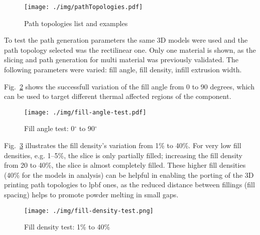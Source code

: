 \begin{table}[!hbt]
\centering
\caption{Path topology main fixed parameters}%
\label{tab:path-topologies-param}
\end{table}

\begin{figure}[!hbt]
  \centering
    \texttt{[image: ./img/pathTopologies.pdf]}
  \caption{Path topologies list and examples}%
\label{fig:path-topologies-test}
\end{figure}

To test the path generation parameters the same 3D models were used and the path
topology selected was the rectilinear one. Only one material is shown, as
the slicing and path generation for multi material was previously validated.
The following
parameters were varied: fill angle, fill density, infill extrusion width.

Fig.~\ref{fig:fill-angle-test} shows the successfull variation of the fill angle
from 0 to 90 degrees, which can be used to target different thermal affected
regions of the component. 

\begin{figure}[!hbt]
  \centering
    \texttt{[image: ./img/fill-angle-test.pdf]}
  \caption{Fill angle test: 0$^{\circ}$ to 90$^{\circ}$}%
\label{fig:fill-angle-test}
\end{figure}

Fig.~\ref{fig:fill-density-test} illustrates the fill density's variation from
1\% to 40\%. For very low fill densities,
e.g. 1--5\%, the slice is only partially filled; increasing the fill density
from 20 to 40\%, the slice is almost completely filled. These higher fill
densities (40\% for the models in analysis) can be helpful in enabling the
porting of the 3D printing path topologies to \gls{lpbf} ones, as the reduced
distance between fillings (fill spacing) helps to promote powder melting in
small gaps.

\begin{figure}[!hbt]
  \centering
    \texttt{[image: ./img/fill-density-test.png]}
  \caption{Fill density test: 1\% to 40\%}%
\label{fig:fill-density-test}
\end{figure}

